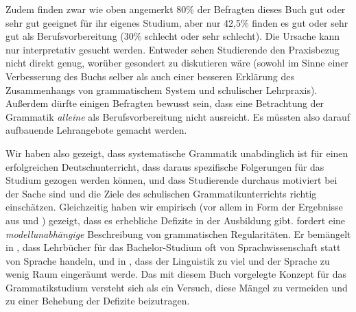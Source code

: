 Zudem finden zwar wie oben angemerkt 80\% der Befragten dieses Buch gut oder sehr gut geeignet für ihr eigenes Studium, aber nur 42,5\% finden es gut oder sehr gut als Berufsvorbereitung (30\% schlecht oder sehr schlecht).
Die Ursache kann nur interpretativ gesucht werden.
Entweder sehen Studierende den Praxisbezug nicht direkt genug, worüber gesondert zu diskutieren wäre (sowohl im Sinne einer Verbesserung des Buchs selber als auch einer besseren Erklärung des Zusammenhangs von grammatischem System und schulischer Lehrpraxis).
Außerdem dürfte einigen Befragten bewusst sein, dass eine Betrachtung der Grammatik \textit{alleine} als Berufsvorbereitung nicht ausreicht.
Es müssten also darauf aufbauende Lehrangebote gemacht werden.

Wir haben also gezeigt, dass systematische Grammatik unabdinglich ist für einen erfolgreichen Deutschunterricht, dass daraus spezifische Folgerungen für das Studium gezogen werden können, und dass Studierende durchaus motiviert bei der Sache sind und die Ziele des schulischen Grammatikunterrichts richtig einschätzen.
Gleichzeitig haben wir empirisch (vor allem in Form der Ergebnisse aus \citealt{TopalovicDuenschede2014} und \citealt{SchaeferSayatz2017a}) gezeigt, dass es erhebliche Defizite in der Ausbildung gibt.
\citet[11]{Eisenberg2013c} fordert eine \textit{modellunabhängige} Beschreibung von grammatischen Regularitäten.
Er bemängelt in \citet[13]{Eisenberg2013c}, dass Lehrbücher für das Bachelor-Studium oft von Sprachwissenschaft statt von Sprache handeln, und in \citet[22]{Eisenberg2004}, dass der Linguistik zu viel und der Sprache zu wenig Raum eingeräumt werde.
Das mit diesem Buch vorgelegte Konzept für das Grammatikstudium versteht sich als ein Versuch, diese Mängel zu vermeiden und zu einer Behebung der Defizite beizutragen.

